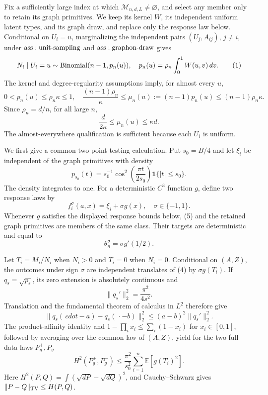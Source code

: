 Fix a sufficiently large index at which \(\mathcal M_{n,d,L}\ne\varnothing\), and select any member only to retain its graph primitives.  We keep its kernel \(W\), its independent uniform latent types, and its graph draw, and replace only the response law below.  Conditional on \(U_i=u\), marginalizing the independent pairs \((U_j,A_{ij})\), \(j\ne i\), under \({\rm ass:unit\text{-}sampling}\) and \({\rm ass:graphon\text{-}draw}\) gives
\[
 N_i\mid U_i=u\sim{\rm Binomial}(n-1,p_n(u)),
 \quad p_n(u)=\rho_n\int_0^1W(u,v)\,dv.
\tag{1}
\]
The kernel and degree-regularity assumptions imply, for almost every \(u\),
\[
 0<p_n(u)\leq\rho_n\kappa\leq1,\quad
 \frac{(n-1)\rho_n}{\kappa}
 \leq\mu_n(u):=(n-1)p_n(u)
 \leq(n-1)\rho_n\kappa.
\tag{2}
\]
Since \(\rho_n=d/n\), for all large \(n\),
\[
 \frac d{2\kappa}\leq\mu_n(u)\leq\kappa d.
\tag{3}
\]
The almost-everywhere qualification is sufficient because each \(U_i\) is uniform.

We first give a common two-point testing calculation.  Put \(s_0=B/4\) and let \(\xi_i\) be independent of the graph primitives with density
\[
 p_{s_0}(t)=s_0^{-1}\cos^2\!\left(\frac{\pi t}{2s_0}\right)
 \mathbf1\{|t|\leq s_0\}.
\tag{4}
\]
The density integrates to one.  For a deterministic \(C^3\) function \(g\), define two response laws by
\[
 f_i^\sigma(a,x)=\xi_i+\sigma g(x),\quad \sigma\in\{-1,1\}.
\tag{5}
\]
Whenever \(g\) satisfies the displayed response bounds below, (5) and the retained graph primitives are members of the same class.  Their targets are deterministic and equal to
\[
 \theta_n^\sigma=\sigma g'(1/2).
\tag{6}
\]

Let \(T_i=M_i/N_i\) when \(N_i>0\) and \(T_i=0\) when \(N_i=0\).  Conditional on \((A,Z)\), the outcomes under sign \(\sigma\) are independent translates of (4) by \(\sigma g(T_i)\).  If \(q_s=\sqrt{p_s}\), its zero extension is absolutely continuous and
\[
 \|q_s'\|_2^2=\frac{\pi^2}{4s^2}.
\tag{7}
\]
Translation and the fundamental theorem of calculus in \(L^2\) therefore give
\[
 \|q_s(\,cdot-a)-q_s(\,\cdot-b)\|_2^2
 \leq(a-b)^2\|q_s'\|_2^2.
\tag{8}
\]
The product-affinity identity and \(1-\prod_i x_i\leq\sum_i(1-x_i)\) for \(x_i\in[0,1]\), followed by averaging over the common law of \((A,Z)\), yield for the two full data laws \(P_g^+,P_g^-\)
\[
 H^2(P_g^+,P_g^-)
 \leq\frac{\pi^2}{s_0^2}\sum_{i=1}^n\mathbb E[g(T_i)^2].
\tag{9}
\]
Here \(H^2(P,Q)=\int(\sqrt{dP}-\sqrt{dQ})^2\), and Cauchy--Schwarz gives \(\|P-Q\|_{\rm TV}\leq H(P,Q)\).

